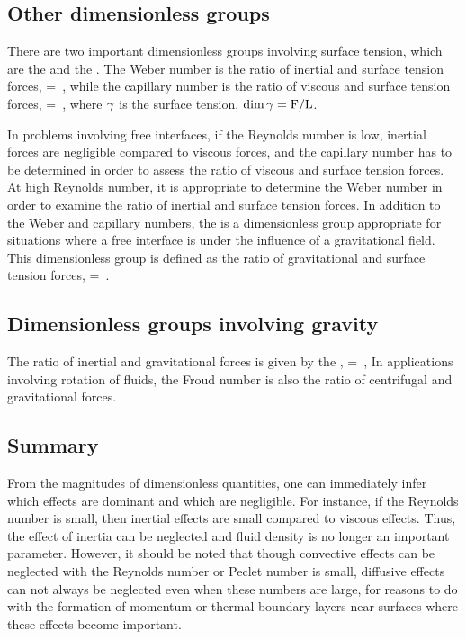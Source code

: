 \subsection{Other dimensionless groups}
There are two important dimensionless groups involving surface tension, which are the  and the . The Weber number is the ratio of inertial and surface tension forces,
\beq
\kweber = \dfrac{\dens\vel^2\length}{\surftens}\,,
\eeq
while the capillary number is the ratio of viscous and surface tension forces,
\beq
\kcapillar = \dfrac{\dynvis\vel}{\surftens}\,,
\eeq
where $\gamma$ is the surface tension, $\dim\gamma = \text{F}/\text{L}$.

In problems involving free interfaces, if the Reynolds number is low, inertial forces are negligible compared to viscous forces, and the capillary number has to be determined in order to assess the ratio of viscous and surface tension forces. At high Reynolds number, it is appropriate to determine the Weber number in order to examine the ratio of inertial and surface tension forces. In addition to the Weber and capillary numbers, the  is a dimensionless group appropriate for situations where a free interface is under the influence of a gravitational field. This dimensionless group is defined as the ratio of gravitational and surface tension forces,
\beq
\kbond = \,.
\eeq


\subsection{Dimensionless groups involving gravity}
The ratio of inertial and gravitational forces is given by the ,
\beq
\kfroud = \,,
\eeq
In applications involving rotation of fluids, the Froud number is also the ratio of centrifugal and gravitational forces.


\subsection{Summary}
From the magnitudes of dimensionless quantities, one can immediately infer which effects are dominant and which are negligible. For instance, if the Reynolds number is small, then inertial effects are small compared to viscous effects. Thus, the effect of inertia can be neglected and fluid density is no longer an important parameter. However, it should be noted that though convective effects can be neglected with the Reynolds number or Peclet number is small, diffusive effects can not always be neglected even when these numbers are large, for reasons to do with the formation of momentum or thermal boundary layers near surfaces where these effects become important.


